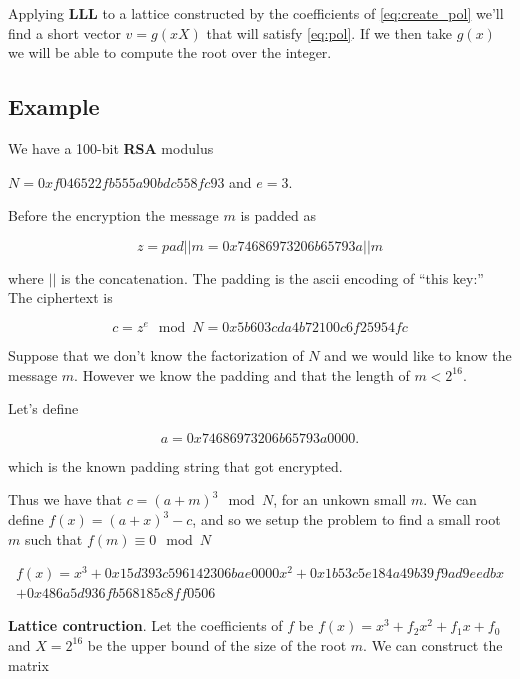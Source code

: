 \documentclass[a4paper,12pt]{report}
\begin{document}
Applying \textbf{LLL} to a lattice constructed by the coefficients of \ref{eq:create_pol} we'll find a short vector $v = g(xX)$ that will
satisfy \ref{eq:pol}. If we then take $g(x)$ we will be able to compute the root over the integer.

\subsection{Example}

We have a 100-bit \textbf{RSA} modulus

\begin{center}
    $N=0xf046522fb555a90bdc558fc93$ and $e = 3$.
\end{center}

Before the encryption the message $m$ is padded as

\[
    z = pad || m = 0x74686973206b65793a || m
\]

where $||$ is the concatenation. The padding is the ascii encoding of ``this key:''\\

The ciphertext is

\[
    c = z^e \mod N = 0x5b603cda4b72100c6f25954fc
\]

Suppose that we don't know the factorization of $N$ and we would like to know the message $m$.
However we know the padding and that the length of $m < 2^{16}$.

\vspace*{10px}

Let's define

\[
a = 0x74686973206b65793a0000
.\] 

which is the known padding string that got encrypted.

\vspace*{10px}

Thus we have that $c = (a + m)^3 \mod N$, for an unkown small $m$.
We can define $f(x) = (a + x)^3 - c$, and so we setup the problem to find a small root $m$ such that $f(m) \equiv 0 \mod N$

\begin{align*}
    f(x) = x^3 + 0x15d393c596142306bae0000x^2 + 0x1b53c5e184a49b39f9ad9eedbx\\
    + 0x486a5d936fb568185c8ff0506
\end{align*}

\vspace*{10px}

\textbf{Lattice contruction}. Let the coefficients of $f$ be $f(x) = x^3 + f_2x^2 + f_1x + f_0$
and $X = 2^{16}$ be the upper bound of the size of the root $m$. We can construct the matrix
\end{document}
